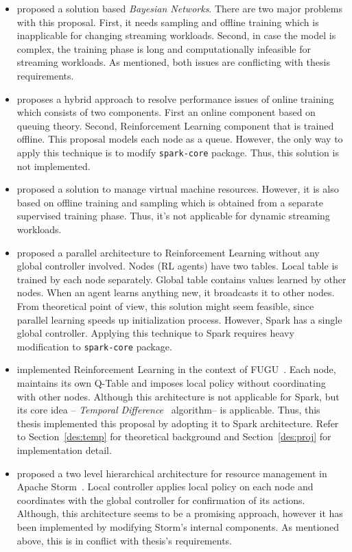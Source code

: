 \begin{description}[leftmargin=0pt]
    \begin{itemize}
        \item \textcite{Herbst:2017} proposed a solution based \emph{Bayesian Networks}. There are two major problems with this proposal. First, it needs sampling and offline training which is inapplicable for changing streaming workloads. Second, in case the model is complex, the training phase is long and computationally infeasible for streaming workloads. As mentioned, both issues are conflicting with thesis requirements.
        \item \textcite{Tesauro2006} proposes a hybrid approach to resolve performance issues of online training which consists of two components. First an online component based on queuing theory. Second, Reinforcement Learning component that is trained offline. This proposal models each node as a queue. However, the only way to apply this technique is to modify \lstinline$spark-core$ package. Thus, this solution is not implemented.
        \item \textcite{Rao:2009:VRL} proposed a solution to manage virtual machine resources. However, it is also based on offline training and sampling which is obtained from a separate supervised training phase. Thus, it's not applicable for dynamic streaming workloads. 
        \item \textcite{Enda:2012} proposed a parallel architecture to Reinforcement Learning without any global controller involved. Nodes (RL agents) have two tables. Local table is trained by each node separately. Global table contains values learned by other nodes. When an agent learns anything new, it broadcasts it to other nodes. From theoretical point of view, this solution might seem feasible, since parallel learning speeds up initialization process. However, Spark has a single global controller. Applying this technique to Spark requires heavy modification to \lstinline$spark-core$ package. 
        \item \textcite{Heinze:2014} implemented Reinforcement Learning in the context of FUGU~\cite{Grandl:2014:MPC}. Each node, maintains its own Q-Table and imposes local policy without coordinating with other nodes. Although this architecture is not applicable for Spark, but its core idea -- \emph{Temporal Difference}~\cite{rlIntro} algorithm-- is applicable. Thus, this thesis implemented this proposal by adopting it to Spark architecture. Refer to Section~\ref{des:temp} for theoretical background and Section~\ref{des:proj} for implementation detail.
        \item \textcite{CARDELLINI2018171} proposed a two level hierarchical architecture for resource management in Apache Storm~\cite{Storm}. Local controller applies local policy on each node and coordinates with the global controller for confirmation of its actions. Although, this architecture seems to be a promising approach, however it has been implemented by modifying Storm's internal components. As mentioned above, this is in conflict with thesis's requirements.

\end{itemize}
\end{description}
